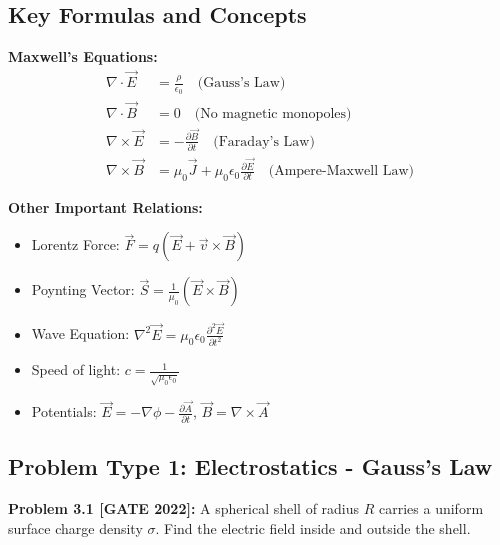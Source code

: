 \documentclass[12pt,a4paper]{article}
\begin{document}
\subsection{Key Formulas and Concepts}

\begin{theorem}
\textbf{Maxwell's Equations:}
\begin{align*}
\nabla \cdot \vec{E} &= \frac{\rho}{\epsilon_0} \quad \text{(Gauss's Law)}\\
\nabla \cdot \vec{B} &= 0 \quad \text{(No magnetic monopoles)}\\
\nabla \times \vec{E} &= -\frac{\partial \vec{B}}{\partial t} \quad \text{(Faraday's Law)}\\
\nabla \times \vec{B} &= \mu_0\vec{J} + \mu_0\epsilon_0\frac{\partial \vec{E}}{\partial t} \quad \text{(Ampere-Maxwell Law)}
\end{align*}

\textbf{Other Important Relations:}
\begin{itemize}
    \item Lorentz Force: $\vec{F} = q(\vec{E} + \vec{v} \times \vec{B})$
    \item Poynting Vector: $\vec{S} = \frac{1}{\mu_0}(\vec{E} \times \vec{B})$
    \item Wave Equation: $\nabla^2\vec{E} = \mu_0\epsilon_0\frac{\partial^2\vec{E}}{\partial t^2}$
    \item Speed of light: $c = \frac{1}{\sqrt{\mu_0\epsilon_0}}$
    \item Potentials: $\vec{E} = -\nabla\phi - \frac{\partial\vec{A}}{\partial t}$, $\vec{B} = \nabla \times \vec{A}$
\end{itemize}
\end{theorem}

\subsection{Problem Type 1: Electrostatics - Gauss's Law}

\textbf{Problem 3.1 [GATE 2022]:} A spherical shell of radius $R$ carries a uniform surface charge density $\sigma$. Find the electric field inside and outside the shell.
\end{document}

